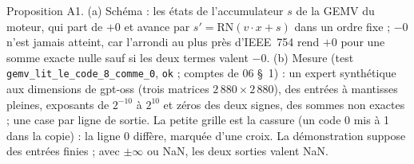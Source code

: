   {Proposition A1. (a) Schéma : les états de l'accumulateur $s$ de la GEMV du moteur, qui part de $+0$ et avance
   par $s'=\mathrm{RN}(v\cdot x+s)$ dans un ordre fixe ; $-0$ n'est jamais atteint, car l'arrondi au plus près
   d'IEEE~754 rend $+0$ pour une somme exacte nulle sauf si les deux termes valent $-0$. (b) Mesure (test
   \texttt{gemv\_lit\_le\_code\_8\_comme\_0}, \texttt{ok} ; comptes de 06 §~1) : un expert synthétique aux dimensions de
   gpt-oss (trois matrices $2\,880\times2\,880$), des entrées à mantisses pleines, exposants de $2^{-10}$ à $2^{10}$
   et zéros des deux signes, des sommes non exactes ; une case par ligne de sortie. La petite grille est la
   cassure (un code 0 mis à 1 dans la copie) : la ligne 0 diffère, marquée d'une croix. La démonstration suppose
   des entrées finies ; avec $\pm\infty$ ou NaN, les deux sorties valent NaN.}

